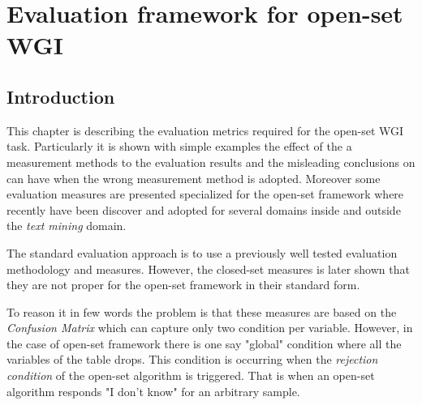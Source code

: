 
\chapter{Evaluation framework for open-set WGI}

\label{chap:eval_methods}


\newcommand{\keyword}[1]{\textbf{#1}}
\newcommand{\tabhead}[1]{\textbf{#1}}
\newcommand{\code}[1]{\texttt{#1}}
\newcommand{\file}[1]{\texttt{\bfseries#1}}
\newcommand{\option}[1]{\texttt{\itshape#1}}


\section{Introduction}\label{chap:eval_methods:sec:intro}

This chapter is describing the evaluation metrics required for the open-set WGI task. Particularly it is shown with simple examples the effect of the a measurement methods to the evaluation results and the misleading conclusions on can have when the wrong measurement method is adopted. Moreover some evaluation measures are presented specialized for the open-set framework where recently have been discover and adopted for several domains inside and outside the \textit{text mining} domain.

The standard evaluation approach is to use a previously well tested evaluation methodology and measures. However, the closed-set measures is later shown that they are not proper for the open-set framework in their standard form. 

To reason it in few words the problem is that these measures are based on the \textit{Confusion Matrix} which can capture only two condition per variable. However, in the case of open-set framework there is one say "global" condition where all the variables of the table drops. This condition is occurring when the \textit{rejection condition} of the open-set algorithm is triggered. That is when an open-set algorithm responds "I don't know" for an arbitrary sample. 

